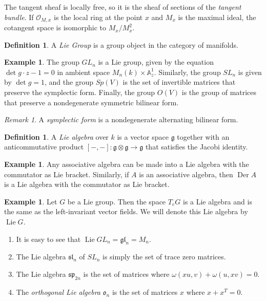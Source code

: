 \documentclass[leqno, openany]{memoir}
\theoremstyle{definition}
\newtheorem{defn}[thm]{Definition}
\newtheorem{exm}[thm]{Example}
\theoremstyle{remark}
\newtheorem{rmk}[thm]{Remark}
\theoremstyle{plain}
\theoremstyle{definition}
\theoremstyle{remark}
\newcommand{\A}{\mathbb{A}}
\newcommand{\mc}[1]{\mathcal{#1}}
\newcommand{\mf}[1]{\mathfrak{#1}}
\DeclareMathOperator{\Der}{Der}
\DeclareMathOperator{\Lie}{Lie}
\begin{document}
The tangent sheaf is locally free, so it is the sheaf of sections of the \textit{tangent bundle}. If $\mc{O}_{M,x}$ is the local ring at the point $x$ and $M_x$ is the maximal ideal, the cotangent space is isomorphic to $M_x / M_x^2$.

\begin{defn}
    A \textit{Lie Group} is a group object in the category of manifolds.
\end{defn}

\begin{exm}
    The group $GL_n$ is a Lie group, given by the equation $\det g \cdot z - 1 = 0$ in ambient space $M_n(k) \times \A^1_{z}$. Similarly, the group $SL_n$ is given by $\det g = 1$, and the group $Sp(V)$ is the set of invertible matrices that preserve the symplectic form. Finally, the group $O(V)$ is the group of matrices that preserve a nondegenerate symmetric bilinear form.
\end{exm}

\begin{rmk}
    A \textit{symplectic form} is a nondegenerate alternating bilinear form.
\end{rmk}

\begin{defn}
    A \textit{Lie algebra} over $k$ is a vector space $\mf{g}$ together with an anticommutative product $[-,-]: \mf{g} \otimes \mf{g} \to \mf{g}$ that satisfies the Jacobi identity.
\end{defn}

\begin{exm}
    Any associative algebra can be made into a Lie algebra with the commutator as Lie bracket. Similarly, if $A$ is an associative algebra, then $\Der A$ is a Lie algebra with the commutator as Lie bracket.
\end{exm}

\begin{exm}
    Let $G$ be a Lie group. Then the space $T_e G$ is a Lie algebra and is the same as the left-invariant vector fields. We will denote this Lie algebra by $\operatorname{Lie} G$.
    \begin{enumerate}
        \item It is easy to see that $\Lie GL_n = \mf{gl}_n = M_n$.
        \item The Lie algebra $\mf{sl}_n$ of $SL_n$ is simply the set of trace zero matrices.
        \item The Lie algebra $\mf{sp}_{2n}$ is the set of matrices where $\omega(xu,v) + \omega(u, xv) = 0$.
        \item The \textit{orthogonal Lie algebra} $\mf{o}_n$ is the set of matrices $x$ where $x + x^T = 0$.
    \end{enumerate}
\end{exm}
\end{document}
